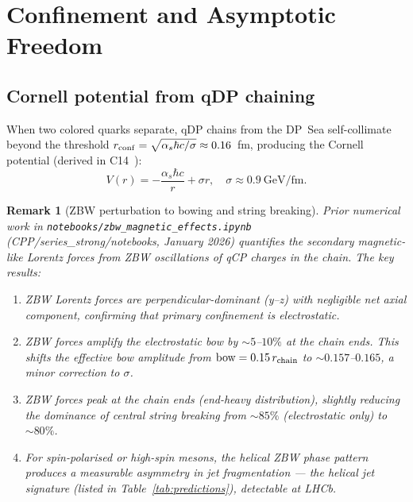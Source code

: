 \documentclass[11pt,a4paper]{article}
\newtheorem{remark}[theorem]{Remark}
\newcommand{\as}{\alpha_s}
\begin{document}
\section{Confinement and Asymptotic Freedom}
\label{sec:confinement}

\subsection{Cornell potential from qDP chaining}

When two colored quarks separate, qDP chains from the DP~Sea
self-collimate beyond the threshold $r_{\rm conf} =
\sqrt{\as\hbar c/\sigma} \approx 0.16$~fm, producing the Cornell
potential (derived in C14~\citep{c14}):
\begin{equation}
V(r) = -\frac{\as\hbar c}{r} + \sigma r,\quad
\sigma \approx 0.9\ \text{GeV/fm}.
\label{eq:cornell}
\end{equation}

\begin{remark}[ZBW perturbation to bowing and string breaking]
\label{rem:zbw_bow}
Prior numerical work in \texttt{notebooks/zbw\_magnetic\_effects.ipynb}
(CPP/series\_strong/notebooks, January 2026) quantifies the secondary
magnetic-like Lorentz forces from ZBW oscillations of qCP charges
in the chain.  The key results:
\begin{enumerate}
\item ZBW Lorentz forces are perpendicular-dominant (y--z) with
  negligible net axial component, confirming that primary
  confinement is electrostatic.
\item ZBW forces amplify the electrostatic bow by $\sim 5$--$10\%$
  at the chain ends.  This shifts the effective bow amplitude from
  $\text{bow} = 0.15\,r_{\rm chain}$ to $\sim 0.157$--$0.165$,
  a minor correction to $\sigma$.
\item ZBW forces peak at the chain ends (end-heavy distribution),
  slightly reducing the dominance of central string breaking from
  $\sim 85\%$ (electrostatic only) to $\sim 80\%$.
\item For spin-polarised or high-spin mesons, the helical ZBW phase
  pattern produces a measurable asymmetry in jet fragmentation ---
  the \emph{helical jet signature} (listed in
  Table~\ref{tab:predictions}), detectable at LHCb.
\end{enumerate}
\end{remark}
\end{document}
